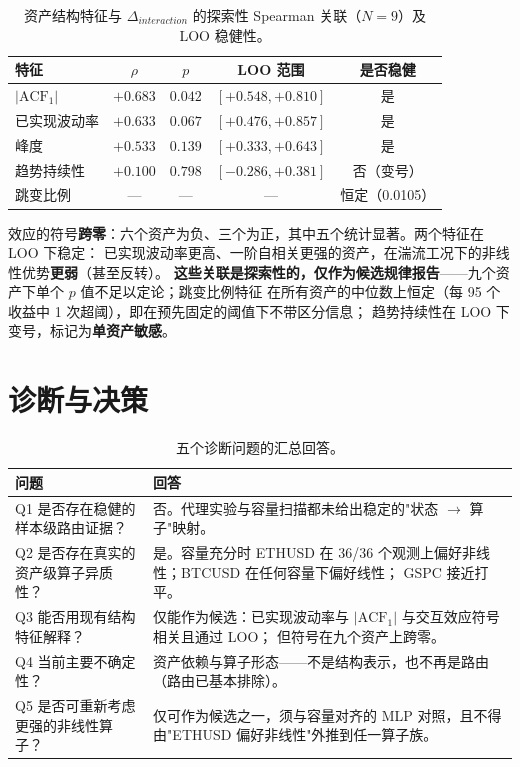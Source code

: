 \documentclass[preprint,12pt]{elsarticle}
\begin{document}
\begin{table}[!t]
\centering
\small
\caption{资产结构特征与 $\Delta_{interaction}$ 的探索性 Spearman 关联（$N=9$）及 LOO 稳健性。}
\label{tab:assoc}
\begin{tabular}{@{}lcccc@{}}
\toprule
特征 & $\rho$ & $p$ & LOO 范围 & 是否稳健 \\
\midrule
$|\mathrm{ACF}_1|$      & $+0.683$ & $0.042$ & $[+0.548,+0.810]$ & 是 \\
已实现波动率            & $+0.633$ & $0.067$ & $[+0.476,+0.857]$ & 是 \\
峰度                    & $+0.533$ & $0.139$ & $[+0.333,+0.643]$ & 是 \\
趋势持续性              & $+0.100$ & $0.798$ & $[-0.286,+0.381]$ & 否（变号） \\
跳变比例                & ---      & ---     & --- & 恒定（0.0105） \\
\bottomrule
\end{tabular}
\end{table}

效应的符号\textbf{跨零}：六个资产为负、三个为正，其中五个统计显著。两个特征在 LOO 下稳定：
已实现波动率更高、一阶自相关更强的资产，在湍流工况下的非线性优势\textbf{更弱}（甚至反转）。
\textbf{这些关联是探索性的，仅作为候选规律报告}——九个资产下单个 $p$ 值不足以定论；跳变比例特征
在所有资产的中位数上恒定（每 95 个收益中 1 次超阈），即在预先固定的阈值下不带区分信息；
趋势持续性在 LOO 下变号，标记为\textbf{单资产敏感}。

\section{诊断与决策}
\label{sec:diagnosis}

\begin{table}[!t]
\centering
\small
\caption{五个诊断问题的汇总回答。}
\label{tab:q}
\begin{tabular}{@{}p{}p{}@{}}
\toprule
问题 & 回答 \\
\midrule
Q1 是否存在稳健的样本级路由证据？ &
否。代理实验与容量扫描都未给出稳定的"状态 $\rightarrow$ 算子"映射。 \\
Q2 是否存在真实的资产级算子异质性？ &
是。容量充分时 ETHUSD 在 36/36 个观测上偏好非线性；BTCUSD 在任何容量下偏好线性；
GSPC 接近打平。 \\
Q3 能否用现有结构特征解释？ &
仅能作为候选：已实现波动率与 $|\mathrm{ACF}_1|$ 与交互效应符号相关且通过 LOO；
但符号在九个资产上跨零。 \\
Q4 当前主要不确定性？ &
资产依赖与算子形态——不是结构表示，也不再是路由（路由已基本排除）。 \\
Q5 是否可重新考虑更强的非线性算子？ &
仅可作为候选之一，须与容量对齐的 MLP 对照，且不得由"ETHUSD 偏好非线性"外推到任一算子族。 \\
\bottomrule
\end{tabular}
\end{table}
\end{document}
